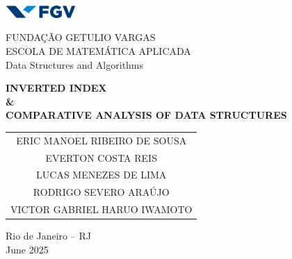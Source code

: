 \begin{titlepage}
    \centering 


    \includegraphics[width=0.2\textwidth]{img/fgv.png} 
    
    \vspace{0.3cm} 

    {\Large FUNDAÇÃO GETULIO VARGAS \\}
    {\normalsize ESCOLA DE MATEMÁTICA APLICADA \\}
    {\normalsize Data Structures and Algorithms}

    \vfill 

    {\bfseries\Large INVERTED INDEX  \\ \vspace{0.2cm} \& \\ \vspace{0.2cm} COMPARATIVE ANALYSIS OF DATA STRUCTURES}

    \vfill 

    \begin{tabular}{c}
        ERIC MANOEL RIBEIRO DE SOUSA \\
        EVERTON COSTA REIS \\
        LUCAS MENEZES DE LIMA \\
        RODRIGO SEVERO ARAÚJO \\
        VICTOR GABRIEL HARUO IWAMOTO \\
    \end{tabular}

    \vspace{2.5cm} 

    {Rio de Janeiro -- RJ \\} 
    {June 2025}

\end{titlepage}